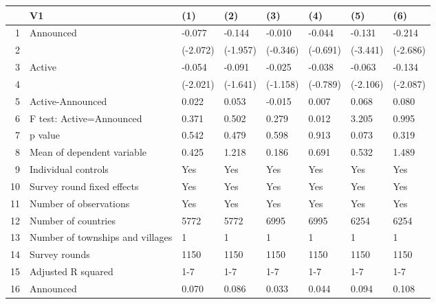 \begin{table}[ht]
\centering
\begin{tabular}{rlllllll}
  \hline
 & V1 & (1) & (2) & (3) & (4) & (5) & (6) \\ 
  \hline
1 & Announced & -0.077 & -0.144 & -0.010 & -0.044 & -0.131 & -0.214 \\ 
  2 &  & (-2.072) & (-1.957) & (-0.346) & (-0.691) & (-3.441) & (-2.686) \\ 
  3 & Active & -0.054 & -0.091 & -0.025 & -0.038 & -0.063 & -0.134 \\ 
  4 &  & (-2.021) & (-1.641) & (-1.158) & (-0.789) & (-2.106) & (-2.087) \\ 
  5 & Active-Announced & 0.022 & 0.053 & -0.015 & 0.007 & 0.068 & 0.080 \\ 
  6 & F test: Active=Announced & 0.371 & 0.502 & 0.279 & 0.012 & 3.205 & 0.995 \\ 
  7 & p value & 0.542 & 0.479 & 0.598 & 0.913 & 0.073 & 0.319 \\ 
  8 & Mean of dependent variable & 0.425 & 1.218 & 0.186 & 0.691 & 0.532 & 1.489 \\ 
  9 & Individual controls & Yes & Yes & Yes & Yes & Yes & Yes \\ 
  10 & Survey round fixed effects & Yes & Yes & Yes & Yes & Yes & Yes \\ 
  11 & Number of observations & Yes & Yes & Yes & Yes & Yes & Yes \\ 
  12 & Number of countries & 5772 & 5772 & 6995 & 6995 & 6254 & 6254 \\ 
  13 & Number of townships and villages & 1 & 1 & 1 & 1 & 1 & 1 \\ 
  14 & Survey rounds & 1150 & 1150 & 1150 & 1150 & 1150 & 1150 \\ 
  15 & Adjusted R squared & 1-7 & 1-7 & 1-7 & 1-7 & 1-7 & 1-7 \\ 
  16 & Announced & 0.070 & 0.086 & 0.033 & 0.044 & 0.094 & 0.108 \\ 
   \hline
\end{tabular}
\end{table}
